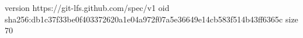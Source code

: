 version https://git-lfs.github.com/spec/v1
oid sha256:db1c37f33be0f403372620a1e04a972f07a5e36649e14cb583f514b43ff6365c
size 70
